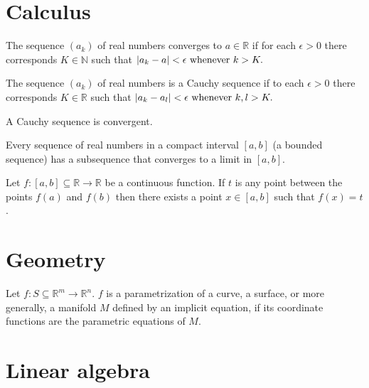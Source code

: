 \documentclass{article}
\begin{document}
\section{Calculus}
\begin{definition}
    The sequence $(a_k)$ of real numbers converges to $a \in \mathbb{R}$
    if for each $\epsilon > 0$ there corresponds $K \in \mathbb{N}$ such that
    \begin{math}
        \lvert a_k - a\rvert < \epsilon \ \text{whenever} \ k > K.
    \end{math}
\end{definition}
\begin{definition}
    The sequence $(a_k)$ of real numbers is a Cauchy sequence if to each
    $\epsilon > 0$ there corresponds $K \in \mathbb{R}$ such that
    \begin{math}
        \lvert a_k - a_l\rvert < \epsilon \ \text{whenever} \ k, l > K.
    \end{math}
\end{definition}
\begin{theorem}
    A Cauchy sequence is convergent.
\end{theorem}
\begin{theorem}
    Every sequence of real numbers in a compact interval $[a, b]$ (a bounded sequence)
    has a subsequence that converges to a limit in $[a, b]$.
\end{theorem}
\begin{theorem}
    Let $f: [a, b] \subseteq \mathbb{R} \rightarrow \mathbb{R}$ be a continuous function. If $t$ is any point between the points $f(a)$ and $f(b)$
    then there exists a point $x \in [a, b]$ such that $f(x) = t$.
\end{theorem}

\section{Geometry}
\begin{definition}[Parametrization]
    Let $f: S \subseteq \mathbb{R}^m \rightarrow \mathbb{R}^n$. $f$ is a
    parametrization of a curve, a surface, or more generally, a manifold $M$
    defined by an implicit equation, if its coordinate functions are the parametric equations
    of $M$.
\end{definition}

\section{Linear algebra}
\end{document}
